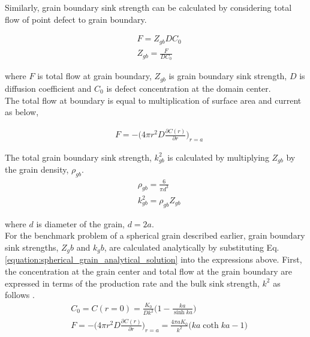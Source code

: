 \documentclass[utf8]{frontiersSCNS} %
\begin{document}
    Similarly, grain boundary sink strength can be calculated by considering total flow of point defect to grain boundary.

    \begin{equation}
      \begin{aligned}
        &F=Z_{gb}DC_0\\
        &Z_{gb}=\frac{F}{DC_0}
      \end{aligned}
      \end{equation}

    where ${F}$ is total flow at grain boundary, ${Z_{gb}}$ is grain boundary sink strength, ${D}$ is diffusion coefficient and ${C_0}$ is defect concentration at the domain center.\\
    
    The total flow at boundary is equal to multiplication of surface area and current as below,

    \begin{equation}
      \begin{aligned}
        &F=-\bigg(4\pi r^2D\frac{\partial C(r)}{\partial r}\bigg)_{r=a}
      \end{aligned}
    \end{equation}
    
    The total grain boundary sink strength, ${k^2_{gb}}$ is calculated by multiplying ${Z_{gb}}$ by the grain density, ${\rho_{gb}}$. \citep{heald1977}\\
    \begin{equation}
      \begin{aligned}
        &\rho_{gb}=\frac{6}{\pi d^3}\\
        &k^2_{gb}=\rho_{gb}Z_{gb}
      \end{aligned}
    \end{equation}

    where ${d}$ is diameter of the grain, ${d=2a}$.\\
  
    For the benchmark problem of a spherical grain described earlier, grain boundary sink strengths, $Z_gb$ and $k_gb$, are calculated analytically by substituting Eq. \ref{equation:spherical_grain_analytical_solution} into the expressions above. First, the concentration at the grain center and total flow at the grain boundary are expressed in terms of the production rate and the bulk sink strength, $k^2$ as follows \cite{heald1977}.\\

    \begin{equation}
      \begin{aligned}
        &C_0=C(r=0)=\frac{K_0}{Dk^2}\bigg(1-\frac{ka}{\sinh{ka}}\bigg)\\
        &F=-\bigg(4\pi r^2D\frac{\partial C(r)}{\partial r}\bigg)_{r=a}=\frac{4\pi aK_0}{k^2}\bigg(ka\coth{ka}-1\bigg)
      \end{aligned}
    \end{equation}\\
    
\end{document}
